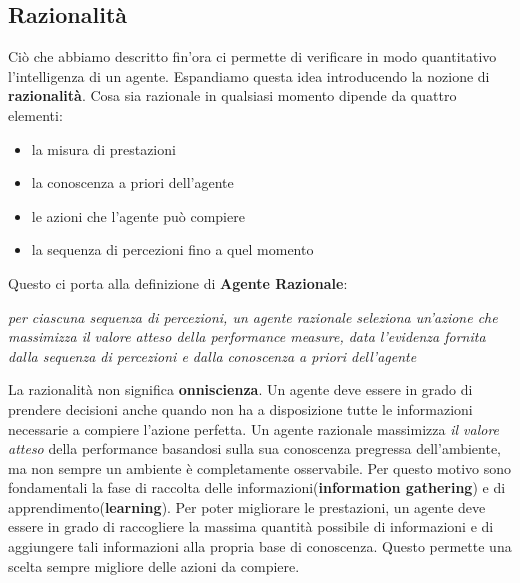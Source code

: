 \subsection{Razionalità}
Ciò che abbiamo descritto fin'ora ci permette di verificare in modo quantitativo l'intelligenza di un agente.
Espandiamo questa idea introducendo la nozione di \textbf{razionalità}.
Cosa sia razionale in qualsiasi momento dipende da quattro elementi:
\begin{itemize}
  \item la misura di prestazioni
  \item la conoscenza a priori dell'agente
  \item le azioni che l'agente può compiere
  \item la sequenza di percezioni fino a quel momento
\end{itemize}
Questo ci porta alla definizione di \textbf{Agente Razionale}:
      \begin{center}
      \emph{per ciascuna sequenza di percezioni, un agente razionale seleziona un'azione che massimizza il valore atteso della performance measure, data l'evidenza 
      fornita dalla sequenza di percezioni e dalla conoscenza a priori dell'agente}
      \end{center}
La razionalità non significa \textbf{onniscienza}. Un agente deve essere in grado di prendere decisioni anche quando
non ha a disposizione tutte le informazioni necessarie a compiere l'azione perfetta. Un agente razionale massimizza \emph{il valore atteso} della performance
basandosi sulla sua conoscenza pregressa dell'ambiente, ma  non sempre un ambiente è completamente osservabile. Per questo motivo sono
fondamentali la fase di raccolta delle informazioni(\textbf{information gathering}) e di apprendimento(\textbf{learning}). Per poter
migliorare le prestazioni, un  agente deve essere in grado di raccogliere la massima quantità possibile di informazioni
e di aggiungere tali informazioni alla propria base di conoscenza. Questo permette una scelta sempre migliore delle azioni da compiere.\cite{aima}
